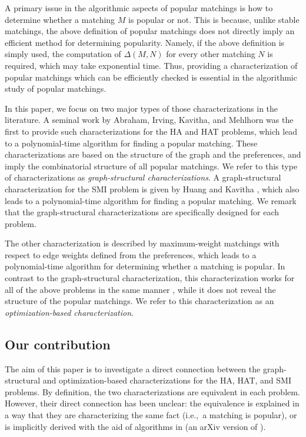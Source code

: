 \documentclass[11pt,a4paper,showkeys]{article}
\theoremstyle{plain}
\theoremstyle{definition}
\begin{document}
A primary issue in the algorithmic aspects of popular matchings is 
how to determine whether a matching $M$ is popular or not. 
This is because, 
unlike stable matchings, 
the above definition of popular matchings does not directly imply an efficient method for determining popularity. 
Namely, 
if the above definition is simply used, 
the computation of $\Delta(M,N)$ for every other matching $N$ is required,  
which may take exponential time. 
Thus, 
providing a characterization of popular matchings which can be efficiently checked is essential in the algorithmic study of popular matchings. 

In this paper, 
we focus on two major types of those characterizations in the literature. 
A seminal work by Abraham, Irving, Kavitha, and Mehlhorn \cite{AIKM07} was the first to provide such characterizations 
for the HA and HAT problems, 
which lead to a polynomial-time algorithm for finding a popular matching. 
These characterizations are based on the structure of the graph and the preferences, 
and imply the combinatorial structure of all popular matchings. 
We refer to this type of characterizations as \emph{graph-structural characterizations}. 
A graph-structural characterization for the SMI problem is given by 
Huang and Kavitha \cite{HK13}, 
which also leads to a polynomial-time algorithm for finding a popular matching. 
We remark that 
the graph-structural characterizations are specifically designed for each problem.  

The other characterization is described by maximum-weight matchings with respect to edge weights defined from the preferences, 
which leads to a polynomial-time algorithm for determining whether a matching is popular. 
In contrast to the graph-structural characterization, 
this characterization works for all of the above problems in the same manner \cite{BIM10,KMN11,McC08}, 
while it does not reveal the structure of the popular matchings. 
We refer to this characterization as an \emph{optimization-based characterization}. 





\subsection{Our contribution}

The aim of this paper is to 
investigate a direct connection between the graph-structural and optimization-based characterizations 
for the HA, HAT, and SMI problems. 
By definition, the two characterizations are equivalent in each problem. 
However, 
their direct connection has been unclear: 
the equivalence is explained in a way that they are characterizing the same fact 
(i.e.,\ a matching is popular), 
or 
is 
implicitly derived with the aid of algorithms in \cite{KKMSS21} (an arXiv version of \cite{KKMSS22soda}). 
\end{document}
